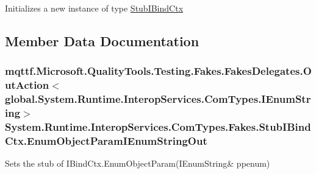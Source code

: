 Initializes a new instance of type \hyperlink{class_system_1_1_runtime_1_1_interop_services_1_1_com_types_1_1_fakes_1_1_stub_i_bind_ctx}{Stub\-I\-Bind\-Ctx}



\subsection{Member Data Documentation}
\hypertarget{class_system_1_1_runtime_1_1_interop_services_1_1_com_types_1_1_fakes_1_1_stub_i_bind_ctx_a8bf81b47b5bd1a01d7f47364fe6bcb4e}{
\subsubsection[{Enum\-Object\-Param\-I\-Enum\-String\-Out}]{\setlength{\rightskip}{0pt plus 5cm}mqttf.\-Microsoft.\-Quality\-Tools.\-Testing.\-Fakes.\-Fakes\-Delegates.\-Out\-Action$<$global.\-System.\-Runtime.\-Interop\-Services.\-Com\-Types.\-I\-Enum\-String$>$ System.\-Runtime.\-Interop\-Services.\-Com\-Types.\-Fakes.\-Stub\-I\-Bind\-Ctx.\-Enum\-Object\-Param\-I\-Enum\-String\-Out}}\label{class_system_1_1_runtime_1_1_interop_services_1_1_com_types_1_1_fakes_1_1_stub_i_bind_ctx_a8bf81b47b5bd1a01d7f47364fe6bcb4e}


Sets the stub of I\-Bind\-Ctx.\-Enum\-Object\-Param(I\-Enum\-String\& ppenum)

